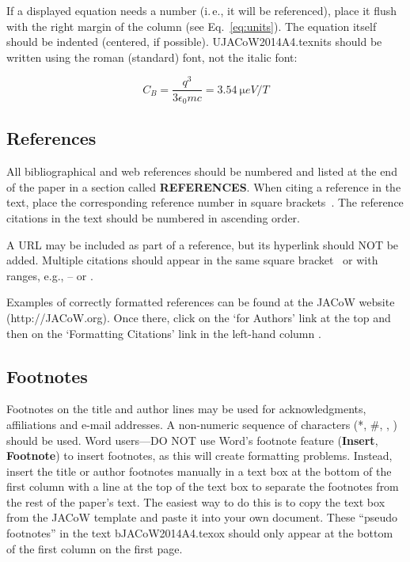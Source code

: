 \documentclass[a4paper,
              ]{jacow}
\newcommand\SEC[1]{\textbf{\uppercase{#1}}}
\begin{document}
If a displayed equation needs a number (i.\,e., it will be referenced), place it flush with the right margin of the column (see Eq.~\ref{eq:units}). The equation itself should be indented (centered, if possible). UJACoW2014A4.texnits should be written using the roman (standard) font,
not the italic font:

\begin{equation}\label{eq:units}
    C_B=\frac{q^3}{3\epsilon_{0} mc}=\SI{3.54}{\micro eV/T}
\end{equation}

\subsection{References}

All bibliographical and web references should be numbered and listed at the
end of the paper in a section called \SEC{References}. When citing a
reference in the text, place the corresponding reference number in square
brackets~\cite{exampl-ref}. The reference citations in the text should be numbered
in ascending order.

A URL may be included as part of a reference, but
its hyperlink should NOT be added. Multiple citations should appear in
the same square bracket~\cite{jacow-help, exampl-ref2, exampl-ref3} or
with ranges, e.g., \cite{jacow-help}--\cite{exampl-ref3} or \cite{jacow-help, exampl-ref, exampl-ref2, exampl-ref3, exampl-last}.

Examples of correctly formatted references can be found at the JACoW website (http://JACoW.org). Once there, click on the ‘for Authors’ link at the top and then on the ‘Formatting
Citations’ link in the left-hand column \cite{jacow-help}.

\subsection{Footnotes}

Footnotes on the title and author lines may be used for acknowledgments,
affiliations and e-mail addresses. A non-numeric sequence of characters (*, \#,
\dag, \ddag) should be used.
Word users---DO NOT use Word's footnote feature (\textbf{Insert}, \textbf{Footnote})
to insert footnotes, as this will create formatting problems. Instead, insert
the title or author footnotes manually in a text box at the bottom of the first column with a
line at the top of the text box to separate the footnotes from the rest of
the paper's text.  The easiest way to do this is to copy the text box from
the JACoW template and paste it into your own document.
These “pseudo footnotes” in the text bJACoW2014A4.texox should only
appear at the bottom of the first column on the first page.
\end{document}
